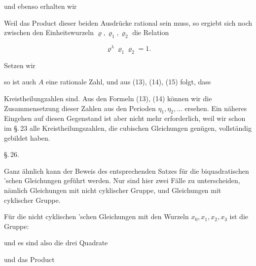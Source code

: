 und ebenso erhalten wir


Weil das Product dieser beiden Ausdrücke rational sein muss, so ergiebt sich
noch zwischen den Einheitswurzeln $\varrho, \varrho_1, \varrho_2$ die Relation

\[
\varrho^\lambda \varrho_1 \varrho_2 = 1.
\]

Setzen wir


so ist auch $A$ eine rationale Zahl, und aus (13), (14), (15) folgt, dass


Kreistheilungzahlen sind. %
Aus den Formeln (13), (14) können wir die Zusammensetzung dieser Zahlen aus den
Perioden $\eta_1, \eta_2, \ldots$ ersehen. Ein näheres Eingehen auf diesen
Gegenstand ist aber nicht mehr erforderlich, weil wir schon im \S.\,23 alle
Kreistheilungszahlen, die cubischen Gleichungen genügen, vollständig gebildet
haben.

\noindent\hrulefill

\begin{center}
\S.\,26.

\end{center}

Ganz ähnlich kann der Beweis des entsprechenden Satzes für die biquadratischen
'schen Gleichungen geführt werden. Nur sind hier zwei Fälle zu
unterscheiden, nämlich Gleichungen mit nicht cyklischer Gruppe, und
Gleichungen mit cyklischer Gruppe.

Für die nicht cyklischen 'schen Gleichungen mit den Wurzeln $x_0, x_1, x_2,
x_3$ ist die Gruppe:


und es sind also die drei Quadrate


und das Product

